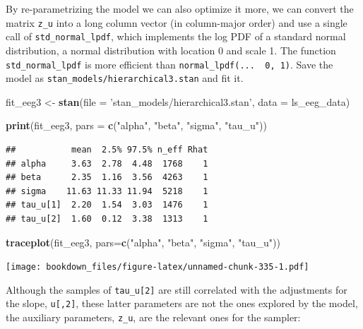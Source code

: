 \documentclass[12pt,]{krantz}
\newenvironment{Shaded}{\begin{snugshade}}{\end{snugshade}}
\newcommand{\KeywordTok}[1]{\textcolor[rgb]{0.13,0.29,0.53}{\textbf{#1}}}
\newcommand{\DataTypeTok}[1]{\textcolor[rgb]{0.13,0.29,0.53}{#1}}
\newcommand{\StringTok}[1]{\textcolor[rgb]{0.31,0.60,0.02}{#1}}
\newcommand{\NormalTok}[1]{#1}
\theoremstyle{definition}
\theoremstyle{definition}
\theoremstyle{definition}
\theoremstyle{remark}
\begin{document}
By re-parametrizing the model we can also optimize it more, we can
convert the matrix \texttt{z\_u} into a long column vector (in
column-major order) and use a single call of \texttt{std\_normal\_lpdf},
which implements the log PDF of a standard normal distribution, a normal
distribution with location 0 and scale 1. The function
\texttt{std\_normal\_lpdf} is more efficient than
\texttt{normal\_lpdf(...\ \textbar{}\ 0,\ 1)}. Save the model as
\texttt{stan\_models/hierarchical3.stan} and fit it.

\begin{Shaded}
\begin{Highlighting}[]
\NormalTok{fit_eeg3 <-}\StringTok{ }\KeywordTok{stan}\NormalTok{(}\DataTypeTok{file =} \StringTok{'stan_models/hierarchical3.stan'}\NormalTok{, }
                 \DataTypeTok{data =}\NormalTok{ ls_eeg_data)}
\end{Highlighting}
\end{Shaded}

\begin{Shaded}
\begin{Highlighting}[]
\KeywordTok{print}\NormalTok{(fit_eeg3, }\DataTypeTok{pars =} \KeywordTok{c}\NormalTok{(}\StringTok{"alpha"}\NormalTok{, }\StringTok{"beta"}\NormalTok{, }\StringTok{"sigma"}\NormalTok{, }\StringTok{"tau_u"}\NormalTok{))}
\end{Highlighting}
\end{Shaded}

\begin{verbatim}
##           mean  2.5% 97.5% n_eff Rhat
## alpha     3.63  2.78  4.48  1768    1
## beta      2.35  1.16  3.56  4263    1
## sigma    11.63 11.33 11.94  5218    1
## tau_u[1]  2.20  1.54  3.03  1476    1
## tau_u[2]  1.60  0.12  3.38  1313    1
\end{verbatim}

\begin{Shaded}
\begin{Highlighting}[]
\KeywordTok{traceplot}\NormalTok{(fit_eeg3, }\DataTypeTok{pars=}\KeywordTok{c}\NormalTok{(}\StringTok{"alpha"}\NormalTok{, }\StringTok{"beta"}\NormalTok{, }\StringTok{"sigma"}\NormalTok{, }\StringTok{"tau_u"}\NormalTok{))}
\end{Highlighting}
\end{Shaded}

\texttt{[image: bookdown\_files/figure-latex/unnamed-chunk-335-1.pdf]}

Although the samples of \texttt{tau\_u{[}2{]}} are still correlated with
the adjustments for the slope, \texttt{u{[},2{]}}, these latter
parameters are not the ones explored by the model, the auxiliary
parameters, \texttt{z\_u}, are the relevant ones for the sampler:
\end{document}
